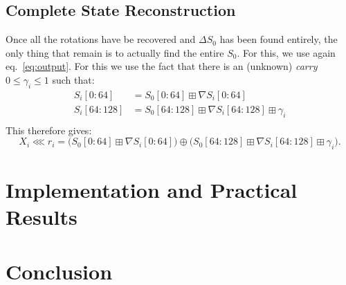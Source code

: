 \documentclass[preprint,svgnames]{iacrtrans}
\begin{document}









	
	
	


\subsection{Complete State Reconstruction}

Once all the rotations have be recovered and $\Delta S_0$ has been found
entirely, the only thing that remain is to actually find the entire $S_0$. For
this, we use again eq.~\eqref{eq:output}. For this we use the fact that there is
an (unknown) \emph{carry} $0\leq \gamma_i \leq 1$ such that:
\begin{align*}
  S_i[0:64] &= S_0[0:64] \boxplus \nabla S_i[0:64] \\
  S_i[64:128] &= S_0[64:128] \boxplus \nabla S_i[64:128] \boxplus \gamma_i \\
\end{align*}
This therefore gives:
\[
  X_i  \lll r_i = \bigl(S_0[0:64] \boxplus \nabla S_i[0:64]\bigr) \oplus \bigl(S_0[64:128] \boxplus \nabla S_i[64:128] \boxplus \gamma_i\bigr).
\]
\section{Implementation and Practical Results}

\section{Conclusion}




\end{document}

